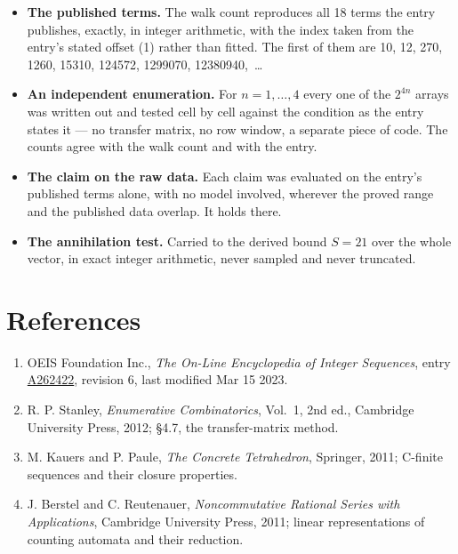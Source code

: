 \documentclass[11pt]{article}
\theoremstyle{definition}
\begin{document}
\begin{itemize}

\item {\bfseries The published terms.} The walk count reproduces all 18 terms the entry publishes, exactly, in integer arithmetic, with the index taken from the entry's stated offset (1) rather than fitted. The first of them are 10, 12, 270, 1260, 15310, 124572, 1299070, 12380940,~\dots

\item {\bfseries An independent enumeration.} For $n = 1,\dots,4$ every one of the $2^{4n}$ arrays was written out and tested cell by cell against the condition as the entry states it --- no transfer matrix, no row window, a separate piece of code. The counts agree with the walk count and with the entry.

\item {\bfseries The claim on the raw data.} Each claim was evaluated on the entry's published terms alone, with no model involved, wherever the proved range and the published data overlap. It holds there.

\item {\bfseries The annihilation test.} Carried to the derived bound $S = 21$ over the whole vector, in exact integer arithmetic, never sampled and never truncated.

\end{itemize}

\section{References}

\begin{enumerate}

\item OEIS Foundation Inc., \emph{The On-Line Encyclopedia of Integer Sequences}, entry \href{https://oeis.org/A262422}{A262422}, revision 6, last modified Mar 15 2023.

\item R. P. Stanley, \emph{Enumerative Combinatorics}, Vol.~1, 2nd ed., Cambridge University Press, 2012; \S4.7, the transfer-matrix method.

\item M. Kauers and P. Paule, \emph{The Concrete Tetrahedron}, Springer, 2011; C-finite sequences and their closure properties.

\item J. Berstel and C. Reutenauer, \emph{Noncommutative Rational Series with Applications}, Cambridge University Press, 2011; linear representations of counting automata and their reduction.

\end{enumerate}
\end{document}
